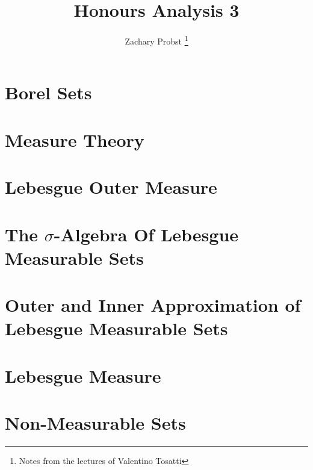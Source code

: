 \documentclass[11pt]{article}
\title{Honours Analysis 3}
\author{Zachary Probst \thanks{Notes from the lectures of Valentino Tosatti}}
\begin{document}
    \maketitle

    \section{Borel Sets}\label{sec:borel-sets}
    

    \section{Measure Theory}\label{sec:measure-theory}
    

    \section{Lebesgue Outer Measure}\label{sec:lebesgue-outer-measure}
    

    \section{The $\sigma$-Algebra Of Lebesgue Measurable Sets}\label{sec:the-$sigma$-algebra-of-lebesgue-measurable-sets}
    

    \section{Outer and Inner Approximation of Lebesgue Measurable Sets}\label{sec:outer-and-inner-approximation-of-lebesgue-measureable-sets}
    
    
    \section{Lebesgue Measure}\label{sec:lebesgue-measure}
    

    \section{Non-Measurable Sets}\label{sec:non-measurable-sets}
\end{document}
